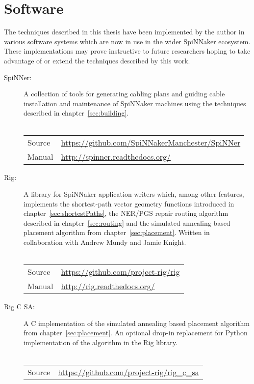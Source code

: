 \chapter{Software}
	\label{sec:software}
	
	The techniques described in this thesis have been implemented by the author
	in various software systems which are now in use in the wider SpiNNaker
	ecosystem. These implementations may prove instructive to future researchers
	hoping to take advantage of or extend the techniques described by this work.
	
	\begin{description}
		
		\item [SpiNNer:] A collection of tools for generating cabling plans and
		guiding cable installation and maintenance of SpiNNaker machines using the
		techniques described in chapter~\ref{sec:building}.
		\\
		\vspace*{-1.25em}
		\\
		\begin{tabular}{ll}
			Source & \url{https://github.com/SpiNNakerManchester/SpiNNer} \\
			Manual & \url{http://spinner.readthedocs.org/} \\
		\end{tabular}
		
		\item [Rig:] A library for SpiNNaker application writers which, among other
		features, implements the shortest-path vector geometry functions introduced
		in chapter~\ref{sec:shortestPaths}, the NER/PGS repair routing algorithm
		described in chapter~\ref{sec:routing} and the simulated annealing based
		placement algorithm from chapter~\ref{sec:placement}. Written in
		collaboration with Andrew Mundy and Jamie Knight.
		\\
		\vspace*{-1.25em}
		\\
		\begin{tabular}{ll}
			Source & \url{https://github.com/project-rig/rig} \\
			Manual & \url{http://rig.readthedocs.org/} \\
		\end{tabular}
		
		\item [Rig C SA:] A C implementation of the simulated annealing based
		placement algorithm from chapter~\ref{sec:placement}. An optional drop-in
		replacement for Python implementation of the algorithm in the Rig library.
		\\
		\vspace*{-1.25em}
		\\
		\begin{tabular}{ll}
			Source & \url{https://github.com/project-rig/rig_c_sa} \\
		\end{tabular}
		

\end{description}
